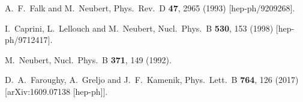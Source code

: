 \documentclass[prd,preprint,superscriptaddress,amsmath,amssymb]{revtex4}
\begin{document}
\begin{thebibliography}{100}
  
  A.~F.~Falk and M.~Neubert,
  Phys.\ Rev.\ D {\bf 47}, 2965 (1993)
  [hep-ph/9209268].


  
     
  
  
  
  I.~Caprini, L.~Lellouch and M.~Neubert,
  Nucl.\ Phys.\ B {\bf 530}, 153 (1998)
  [hep-ph/9712417].
  
 
  
  M.~Neubert,
  Nucl.\ Phys.\ B {\bf 371}, 149 (1992).
  
  D.~A.~Faroughy, A.~Greljo and J.~F.~Kamenik,
  Phys.\ Lett.\ B {\bf 764}, 126 (2017)
  [arXiv:1609.07138 [hep-ph]].
  
  
 
\end{thebibliography}
\end{document}
